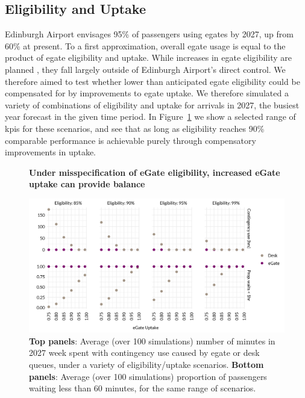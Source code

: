 \documentclass[10pt]{article}
\newcommand*{\figuretitle}[1]{%
    {\centering%
    \textbf{#1}%
    \par\medskip}%
}
\begin{document}
\subsection{Eligibility and Uptake}
Edinburgh Airport envisages 95\% of passengers using \glspl{egate} by 2027, up from 60\% at present. To a first approximation, overall \gls{egate} usage is equal to the product of \gls{egate} eligibility and uptake. While increases in \gls{egate} eligibility are planned \cite{UK_border_2025}, they fall largely outside of Edinburgh Airport's direct control. We therefore aimed to test whether lower than anticipated \gls{egate} eligibility could be compensated for by improvements to \gls{egate} uptake. We therefore simulated a variety of combinations of eligibility and uptake for arrivals in 2027, the busiest year forecast in the given time period. In Figure~\ref{fig:robustness_fig} we show a selected range of \glspl{kpi} for these scenarios, and see that as long as eligibility reaches 90\% comparable performance is achievable purely through compensatory improvements in uptake.

\begin{figure}[!ht]
    \centering
    \figuretitle{Under misspecification of eGate eligibility, increased eGate uptake can provide balance}
    \includegraphics[width=\textwidth]{figures/robustness_fig.png}
     \caption{\textbf{Top panels}: Average (over 100 simulations) number of minutes in 2027 week spent with contingency use caused by \gls{egate} or desk queues, under a variety of eligibility/uptake scenarios. \textbf{Bottom panels}: Average (over 100 simulations) proportion of passengers waiting less than 60 minutes, for the same range of scenarios.} \label{fig:robustness_fig}
\end{figure}
\end{document}
